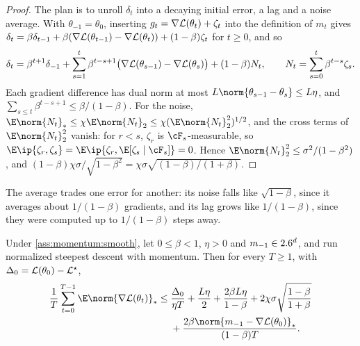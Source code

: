 \begin{refsection}
\begin{proof}
The plan is to unroll $\delta_t$ into a decaying initial error, a lag and a noise average. With $\theta_{-1}=\theta_0$, inserting $g_t=\nabla\mathcal{L}(\theta_t)+\zeta_t$ into the definition of $m_t$ gives $\delta_t=\beta\delta_{t-1}+\beta(\nabla\mathcal{L}(\theta_{t-1})-\nabla\mathcal{L}(\theta_t))+(1-\beta)\zeta_t$ for $t\ge0$, and so
\[
  \delta_t=\beta^{t+1}\delta_{-1}+\sum_{s=1}^t\beta^{t-s+1}\bigl(\nabla\mathcal{L}(\theta_{s-1})-\nabla\mathcal{L}(\theta_s)\bigr)+(1-\beta)N_t,\qquad N_t=\sum_{s=0}^t\beta^{t-s}\zeta_s.
\]
Each gradient difference has dual norm at most $L\norm{\theta_{s-1}-\theta_s}\le L\eta$, and $\sum_{s\le t}\beta^{t-s+1}\le\beta/(1-\beta)$. For the noise, $\E\norm{N_t}_*\le\chi\E\norm{N_t}_2\le\chi(\E\norm{N_t}_2^2)^{1/2}$, and the cross terms of $\E\norm{N_t}_2^2$ vanish: for $r<s$, $\zeta_r$ is $\cF_s$-measurable, so $\E\ip{\zeta_r,\zeta_s}=\E\ip{\zeta_r,\E[\zeta_s\mid\cF_s]}=0$. Hence $\E\norm{N_t}_2^2\le\sigma^2/(1-\beta^2)$, and $(1-\beta)\chi\sigma/\sqrt{1-\beta^2}=\chi\sigma\sqrt{(1-\beta)/(1+\beta)}$.
\end{proof}

The average trades one error for another: its noise falls like $\sqrt{1-\beta}$, since it averages about $1/(1-\beta)$ gradients, and its lag grows like $1/(1-\beta)$, since they were computed up to $1/(1-\beta)$ steps away.

\begin{theorem}\label{thm:momentum:normalized}
Under \cref{ass:momentum:smooth}, let $0\le\beta<1$, $\eta>0$ and $m_{-1}\in2.6^d$, and run normalized steepest descent with momentum. Then for every $T\ge1$, with $\Delta_0=\mathcal{L}(\theta_0)-\mathcal{L}^\star$,
\begin{equation}\label{eq:momentum:normalized}
\begin{aligned}
  \frac1T\sum_{t=0}^{T-1}\E\norm{\nabla\Loss(\theta_t)}_*\le{}&\frac{\Delta_0}{\eta T}+\frac{L\eta}2+\frac{2\beta L\eta}{1-\beta}+2\chi\sigma\sqrt{\frac{1-\beta}{1+\beta}}\\
  &+\frac{2\beta\norm{m_{-1}-\nabla\Loss(\theta_0)}_*}{(1-\beta)T}.
\end{aligned}
\end{equation}
\end{theorem}


\end{refsection}

